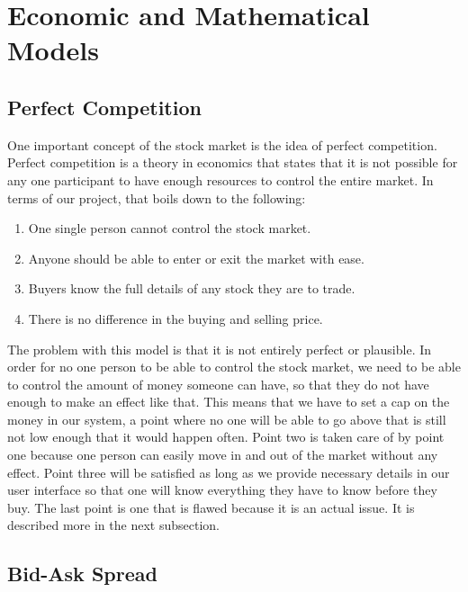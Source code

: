 \section{Economic and Mathematical Models}

\subsection{Perfect Competition}

One important concept of the stock market is the idea of perfect competition. Perfect competition is a theory in economics that states that it is not possible for any one participant to have enough resources to control the entire market. In terms of our project, that boils down to the following: 
\begin{enumerate}
\item
One single person cannot control the stock market.
\item
Anyone should be able to enter or exit the market with ease.
\item
Buyers know the full details of any stock they are to trade.
\item
There is no difference in the buying and selling price.
\end{enumerate}
The problem with this model is that it is not entirely perfect or plausible. In order for no one person to be able to control the stock market, we need to be able to control the amount of money someone can have, so that they do not have enough to make an effect like that. This means that we have to set a cap on the money in our system, a point where no one will be able to go above that is still not low enough that it would happen often. Point two is taken care of by point one because one person can easily move in and out of the market without any effect. Point three will be satisfied as long as we provide necessary details in our user interface so that one will know everything they have to know before they buy. The last point is one that is flawed because it is an actual issue. It is described more in the next subsection.

\subsection{Bid-Ask Spread}

